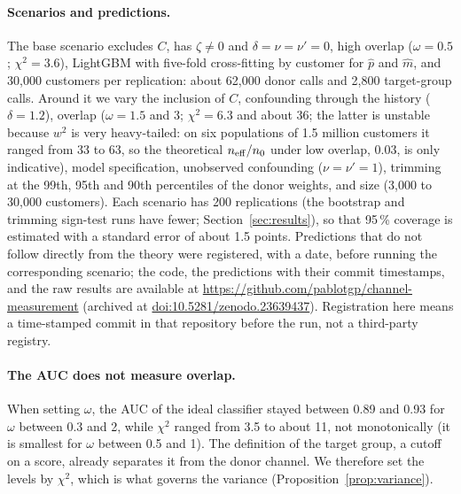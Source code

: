 \paragraph{Scenarios and predictions.} The base scenario excludes $C$, has $\zeta\ne0$ and $\delta=\nu=\nu'=0$, high overlap ($\omega=0.5$; $\chi^2=3.6$), LightGBM \citep{ke2017} with five-fold cross-fitting by customer for $\hat p$ and $\hat m$, and 30{,}000 customers per replication: about 62{,}000 donor calls and 2{,}800 target-group calls. Around it we vary the inclusion of $C$, confounding through the history ($\delta=1.2$), overlap ($\omega=1.5$ and $3$; $\chi^2=6.3$ and about 36; the latter is unstable because $w^2$ is very heavy-tailed: on six populations of 1.5 million customers it ranged from 33 to 63, so the theoretical $n_{\mathrm{eff}}/n_0$ under low overlap, 0.03, is only indicative), model specification, unobserved confounding ($\nu=\nu'=1$), trimming at the 99th, 95th and 90th percentiles of the donor weights, and size (3{,}000 to 30{,}000 customers). Each scenario has 200 replications (the bootstrap and trimming sign-test runs have fewer; Section~\ref{sec:results}), so that 95\,\% coverage is estimated with a standard error of about 1.5 points. Predictions that do not follow directly from the theory were registered, with a date, before running the corresponding scenario; the code, the predictions with their commit timestamps, and the raw results are available at \url{https://github.com/pablotgp/channel-measurement} (archived at \href{https://doi.org/10.5281/zenodo.23639437}{doi:10.5281/zenodo.23639437}). Registration here means a time-stamped commit in that repository before the run, not a third-party registry.

\paragraph{The AUC does not measure overlap.} When setting $\omega$, the AUC of the ideal classifier stayed between 0.89 and 0.93 for $\omega$ between 0.3 and 2, while $\chi^2$ ranged from 3.5 to about 11, not monotonically (it is smallest for $\omega$ between 0.5 and 1). The definition of the target group, a cutoff on a score, already separates it from the donor channel. We therefore set the levels by $\chi^2$, which is what governs the variance (Proposition~\ref{prop:variance}).
